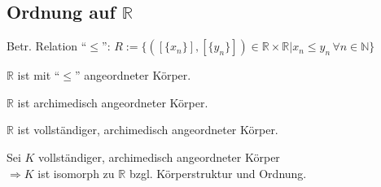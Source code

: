 \subsection*{Ordnung auf $\mathbb{R}$}
\begin{definition}
	Betr. Relation "`$\le$"': $R:=\{ ([\{x_n\}],[\{y_n\}])\in\mathbb{R}\times\mathbb{R} | x_n \le y_n\,\forall n\in\mathbb{N}\}$
\end{definition}
\begin{proposition}
	$\mathbb{R}$ ist mit "`$\le$"' angeordneter Körper.
\end{proposition}
\begin{proposition}
	$\mathbb{R}$ ist archimedisch angeordneter Körper.
\end{proposition}
\begin{theorem}
	$\mathbb{R}$ ist vollständiger, archimedisch angeordneter Körper.
\end{theorem}
\begin{theorem}
	Sei $K$ vollständiger, archimedisch angeordneter Körper\\
	$\Rightarrow K$ ist isomorph zu $\mathbb{R}$ bzgl. Körperstruktur und Ordnung.
\end{theorem}

